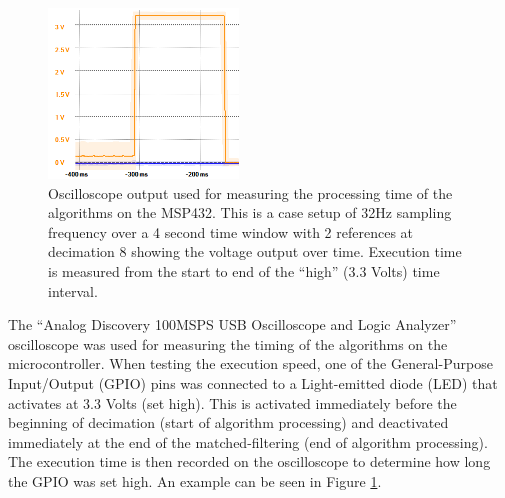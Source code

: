 \documentclass[journal]{IEEEtran}
\begin{document}
\begin{figure}[!ht]
   \centering
   \includegraphics[width=0.45\textwidth]{reference_pulse_32Hz_4sec_8downsample_2.png}
   \caption{Oscilloscope output used for measuring the processing time of the algorithms on the MSP432. This is a case setup of 32Hz sampling frequency over a 4 second time window with 2 references at decimation 8 showing the voltage output over time. Execution time is measured from the start to end of the ``high'' (3.3 Volts) time interval.}
   \label{fig:time_measure}
\end{figure}
%
The ``Analog Discovery 100MSPS USB Oscilloscope and Logic Analyzer'' oscilloscope was used for measuring the timing of the algorithms on the microcontroller.
When testing the execution speed, one of the General-Purpose Input/Output (GPIO) pins was connected to a Light-emitted diode (LED) that activates at 3.3 Volts (set high).
This is activated immediately before the beginning of decimation (start of algorithm processing) and deactivated immediately at the end of the matched-filtering (end of algorithm processing).
The execution time is then recorded on the oscilloscope to determine how long the GPIO was set high.
An example can be seen in Figure \ref{fig:time_measure}.
\end{document}
